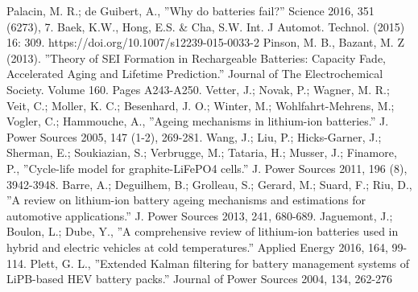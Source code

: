 \documentclass[10]{IEEEtran}
\begin{document}
	\begin{thebibliography}{00}
		 Palacin, M. R.; de Guibert, A., ''Why do batteries fail?'' Science 2016, 351 (6273), 7.
		 Baek, K.W., Hong, E.S. \& Cha, S.W. Int. J Automot. Technol. (2015) 16: 309. https://doi.org/10.1007/s12239-015-0033-2
		 Pinson, M. B., Bazant, M. Z (2013). ''Theory of SEI Formation in Rechargeable Batteries: Capacity Fade, Accelerated Aging and Lifetime Prediction.'' Journal of The Electrochemical Society. Volume 160. Pages A243-A250. 
		 Vetter, J.; Novak, P.; Wagner, M. R.; Veit, C.; Moller, K. C.; Besenhard, J. O.; Winter, M.; Wohlfahrt-Mehrens, M.; Vogler, C.; Hammouche, A., ''Ageing mechanisms in lithium-ion batteries.'' J. Power Sources 2005, 147 (1-2), 269-281.
		 Wang, J.; Liu, P.; Hicks-Garner, J.; Sherman, E.; Soukiazian, S.; Verbrugge, M.; Tataria, H.; Musser, J.; Finamore, P., ''Cycle-life model for graphite-LiFePO4 cells.'' J. Power Sources 2011, 196 (8), 3942-3948.
		 Barre, A.; Deguilhem, B.; Grolleau, S.; Gerard, M.; Suard, F.; Riu, D., ''A review on lithium-ion battery ageing mechanisms and estimations for automotive applications.'' J. Power Sources 2013, 241, 680-689.
		 Jaguemont, J.; Boulon, L.; Dube, Y., ''A comprehensive review of lithium-ion batteries used in hybrid and electric vehicles at cold temperatures.'' Applied Energy 2016, 164, 99-114.
		 Plett, G. L., ''Extended Kalman filtering for battery management systems of LiPB-based HEV battery packs.'' Journal of Power Sources 2004, 134, 262-276
	\end{thebibliography}
	
\end{document}
